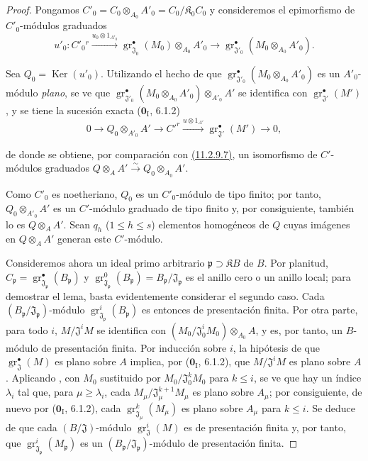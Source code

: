 \begin{proof}
Pongamos
$C'_0=C_0\otimes_{A_0}A'_0=C_0/\mathfrak K_0C_0$
y consideremos el epimorfismo de $C'_0$-módulos graduados
\[
u'_0:C'_0{}^{r}\xrightarrow{u_0\otimes1_{A'_0}}
\operatorname{gr}_{\mathfrak J_0}^\bullet(M_0)\otimes_{A_0}A'_0
\longrightarrow
\operatorname{gr}_{\mathfrak J'_0}^\bullet(M_0\otimes_{A_0}A'_0).
\]

Sea $Q_0=\operatorname{Ker}(u'_0)$. Utilizando el hecho de que
$\operatorname{gr}_{\mathfrak J'_0}^\bullet(M_0\otimes_{A_0}A'_0)$
es un $A'_0$-módulo \emph{plano}, se ve que $\operatorname{gr}_{\mathfrak J'_0}^\bullet(M_0\otimes_{A_0}A'_0)\otimes_{A'_0}A'$ se identifica con $\operatorname{gr}_{\mathfrak J'}^\bullet(M')$ , y se tiene la sucesión exacta ($\mathbf 0_{\mathrm I}$, 6.1.2)
\begin{equation}
0\longrightarrow Q_0\otimes_{A'_0}A'\longrightarrow C'^{r}
\xrightarrow{u\otimes1_{A'}}\operatorname{gr}_{\mathfrak J'}^\bullet(M')
\longrightarrow0,
\label{IV.11.2.9.8-fr}
\tag{11.2.9.8}
\end{equation}


de donde se obtiene, por comparación con {\hyperlink{ega4.c04.thm.11-2-9}{(11.2.9.7)}}, un isomorfismo de $C'$-módulos graduados
$Q\otimes_AA'\xrightarrow{\sim}Q_0\otimes_{A_0}A'$.

Como $C'_0$ es noetheriano, $Q_0$ es un $C'_0$-módulo de tipo finito; por tanto, $Q_0\otimes_{A'_0}A'$ es un $C'$-módulo graduado de tipo finito y, por consiguiente, también lo es $Q\otimes_AA'$. Sean $q_h$ ($1\leq h\leq s$) elementos homogéneos de $Q$ cuyas imágenes en $Q\otimes_AA'$ generan este $C'$-módulo.

Consideremos ahora un ideal primo arbitrario $\mathfrak p\supset\mathfrak KB$ de $B$. Por planitud,
$C_\mathfrak p=\operatorname{gr}_{\mathfrak J_\mathfrak p}^\bullet(B_\mathfrak p)$
y $\operatorname{gr}_{\mathfrak J_\mathfrak p}^0(B_\mathfrak p)
=B_\mathfrak p/\mathfrak J_\mathfrak p$ es el anillo cero o un anillo local; para demostrar el lema, basta evidentemente considerar el segundo caso. Cada $(B_\mathfrak p/\mathfrak J_\mathfrak p)$-módulo $\operatorname{gr}_{\mathfrak J_\mathfrak p}^i(B_\mathfrak p)$ es entonces de presentación finita. Por otra parte, para todo $i$,
$M/\mathfrak J^iM$ se identifica con $(M_0/\mathfrak J_0^iM_0)\otimes_{A_0}A$,
y es, por tanto, un $B$-módulo de presentación finita. Por inducción sobre $i$, la hipótesis de que $\operatorname{gr}_{\mathfrak J}^\bullet(M)$ es plano sobre $A$ implica, por ($\mathbf 0_{\mathrm I}$, 6.1.2), que $M/\mathfrak J^iM$ es plano sobre $A$. Aplicando , con $M_0$ sustituido por $M_0/\mathfrak J_0^kM_0$ para $k\leq i$, se ve que hay un índice $\lambda_i$ tal que, para $\mu\geq\lambda_i$, cada $M_\mu/\mathfrak J_\mu^{k+1}M_\mu$ es plano sobre $A_\mu$; por consiguiente, de nuevo por ($\mathbf 0_{\mathrm I}$, 6.1.2), cada $\operatorname{gr}_{\mathfrak J_\mu}^k(M_\mu)$ es plano sobre $A_\mu$ para $k\leq i$. Se deduce de  que cada $(B/\mathfrak J)$-módulo $\operatorname{gr}_{\mathfrak J}^i(M)$ es de presentación finita y, por tanto, que $\operatorname{gr}_{\mathfrak J_\mathfrak p}^i(M_\mathfrak p)$ es un $(B_\mathfrak p/\mathfrak J_\mathfrak p)$-módulo de presentación finita.


\end{proof}
